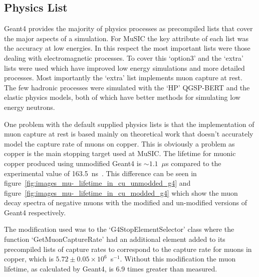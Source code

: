 \subsection{Physics List} %
\label{sec:physics_list}
Geant4 provides the majority of physics processes as precompiled lists that cover the major aspects of a simulation. For MuSIC the key attribute of each list was the accuracy at low energies. In this respect the most important lists were those dealing with electromagnetic processes. To cover this `option3' and the `extra' lists were used which have improved low energy simulations and more detailed processes. Most importantly the `extra' list implements muon capture at rest. The few hadronic processes were simulated with the `HP' QGSP-BERT and the elastic physics models, both of which have better methods for simulating low energy neutrons.

One problem with the default supplied physics lists is that the implementation of muon capture at rest is based mainly on theoretical work that doesn't accurately model the capture rate of muons on copper. This is obviously a problem as copper is the main stopping target used at MuSIC. The lifetime for muonic copper produced using unmodified Geant4 is \(\sim1.1\)~\(\mu\)s compared to the experimental value of 163.5~ns~\cite{suzuki_mu_capture_rates}. This difference can be seen in  figure~\ref{fig:images_mu-_lifetime_in_cu_unmodded_g4} and figure~\ref{fig:images_mu-_lifetime_in_cu_modded_g4} which show the muon decay spectra of negative muons with the modified and un-modified versions of Geant4 respectively. 

The modification used was to the `G4StopElementSelector' class where the function `GetMuonCaptureRate' had an additional element added to its precompiled lists of capture rates to correspond to the capture rate for muons in copper, which is \(5.72\pm0.05\times10^6\)~s\(^{-1}\). Without this modification the muon lifetime, as calculated by Geant4, is 6.9 times greater than measured.

